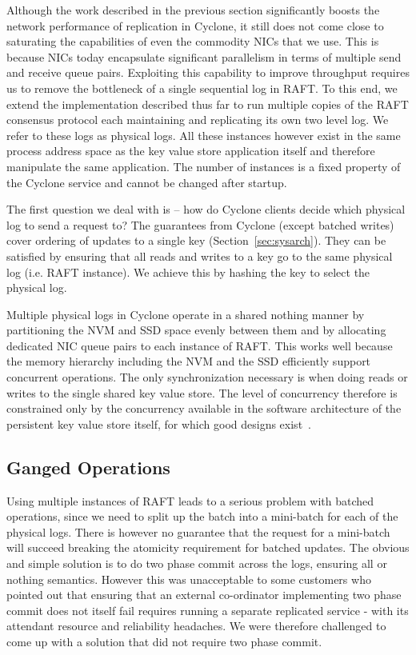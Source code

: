 \documentclass[letterpaper,twocolumn,10pt]{article}
\begin{document}
Although the work described in the previous section significantly boosts the
network performance of replication in Cyclone, it still does not come close to
saturating the capabilities of even the commodity NICs that we use. This is
because NICs today encapsulate significant parallelism in terms of
multiple send and receive queue pairs. Exploiting this capability to improve
throughput requires us to remove the bottleneck of a single sequential log in
RAFT. To this end, we extend the implementation described thus far to run
multiple copies of the RAFT consensus protocol each maintaining and replicating
its own two level log. We refer to these logs as physical logs. All these
instances however exist in the same process address space as the key value store
application itself and therefore manipulate the same application. The number of 
instances is a fixed property of the Cyclone service and cannot be changed after 
startup.

The first question we deal with is -- how do Cyclone clients decide which
physical log to send a request to? The guarantees from Cyclone (except batched
writes)  cover ordering of updates to a single key (Section~\ref{sec:sysarch}). They can 
be satisfied by ensuring that all reads and writes to a key go to the same physical log
(i.e. RAFT instance). We achieve this by hashing the key to select the physical
log.

Multiple physical logs in Cyclone operate in a shared nothing manner by
partitioning the NVM and SSD space evenly between them and by allocating
dedicated NIC queue pairs to each instance of RAFT. This works well because the
memory hierarchy including the NVM and the SSD efficiently support concurrent
operations. The only synchronization necessary is when doing reads or writes to
the single shared key value store.  The level of concurrency therefore is
constrained only by the concurrency available in the software architecture of
the persistent key value store itself, for which good designs
exist~\cite{flodb}.

\subsection{Ganged Operations}
Using multiple instances of RAFT leads to a serious problem with batched operations, 
since we need to split up the batch into a mini-batch for each of the physical logs. There
is however no guarantee that the request for a mini-batch will succeed breaking the atomicity
requirement for batched updates. The obvious and simple solution is to do two phase commit across
the logs, ensuring all or nothing semantics. However this was unacceptable to some customers who
pointed out that ensuring that an external co-ordinator implementing two phase commit does not itself
fail requires running a separate replicated service - with its attendant resource and reliability headaches.
We were therefore challenged to come up with a solution that did not require two phase commit.
\end{document}
